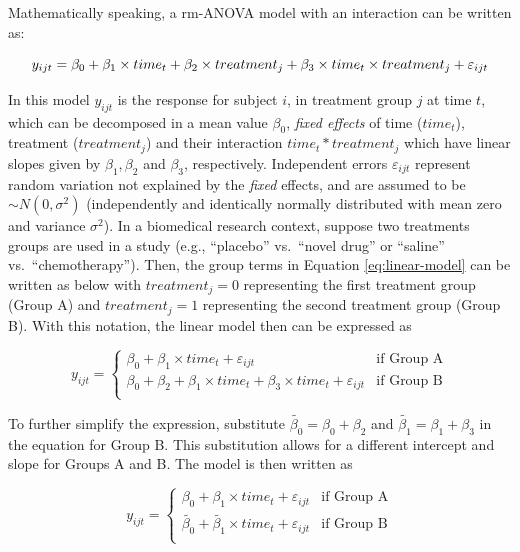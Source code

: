 \documentclass[
]{article}
\begin{document}
Mathematically speaking, a rm-ANOVA model with an interaction can be written as:

\begin{equation}
y_{ijt} = \beta_0+\beta_1 \times time_{t} +\beta_2 \times treatment_{j} +\beta_3 \times time_{t}\times treatment_{j}+\varepsilon_{ijt}\\ 
\label{eq:linear-model}
\end{equation}

In this model \(y_{ijt}\) is the response for subject \(i\), in treatment group \(j\) at time \(t\), which can be decomposed in a mean value \(\beta_0\), \emph{fixed effects} of time (\(time_t\)), treatment (\(treatment_j\)) and their interaction \(time_t*treatment_j\) which have linear slopes given by \(\beta_1, \beta_2\) and \(\beta_3\), respectively. Independent errors \(\varepsilon_{ijt}\) represent random variation not explained by the \emph{fixed} effects, and are assumed to be \(\sim N(0,\sigma^2)\) (independently and identically normally distributed with mean zero and variance \(\sigma^2\)).
In a biomedical research context, suppose two treatments groups are used in a study (e.g., ``placebo'' vs.~``novel drug'' or ``saline'' vs.~``chemotherapy''). Then, the group terms in Equation \eqref{eq:linear-model} can be written as below with \(treatment_j=0\) representing the first treatment group (Group A) and \(treatment_j=1\) representing the second treatment group (Group B). With this notation, the linear model then can be expressed as

\begin{equation}
y_{ijt} = \begin{cases}
\beta_0 + \beta_1\times time_{t}+\varepsilon_{ijt}   & \mbox{if Group A}\\
\beta_0 + \beta_2+\beta_1 \times time_{t} +\beta_3 \times time_{t}+\varepsilon_{ijt}  & \mbox{if Group B}\\
\end{cases}
\label{eq:ANOVA-by-group}
\end{equation}

To further simplify the expression, substitute \(\widetilde{\beta_{0}}=\beta_0+\beta_{2}\) and \(\widetilde{\beta_{1}}=\beta_{1}+\beta_{3}\) in the equation for Group B. This substitution allows for a different intercept and slope for Groups A and B. The model is then written as

\begin{equation}
y_{ijt} = \begin{cases}
\beta_0 + \beta_1\times time_{t}+\varepsilon_{ijt}   & \mbox{if Group A}\\
\widetilde{\beta_{0}} + \widetilde{\beta_1} \times time_{t}+\varepsilon_{ijt}  & \mbox{if Group B}\\
\end{cases}
\label{eq:ANOVA-lines}
\end{equation}
\end{document}

